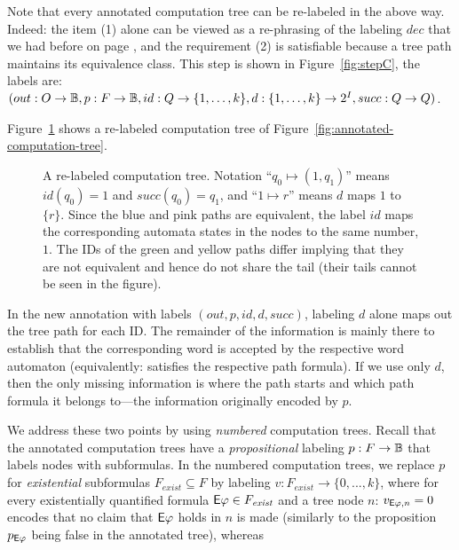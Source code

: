 Note that every annotated computation tree can be re-labeled in the above way.
Indeed:
the item (1) alone can be viewed as a re-phrasing of the labeling $dec$ that we had before on page \pageref{page:decision-mapping},
and the requirement (2) is satisfiable because a tree path maintains its equivalence class.
This step is shown in Figure~\ref{fig:stepC}, the labels are:
$(out:O\to\mathbb{B},
p:F\to\mathbb{B},
id: Q \to \{1,\ldots,k\},
d: \{1,\ldots,k\}\to {2^I},
succ: Q \to Q)$.

Figure~\ref{fig:relabeled-tree} shows a re-labeled computation tree of Figure~\ref{fig:annotated-computation-tree}.
\begin{figure}[tb]
\center

\caption{%
  A re-labeled computation tree.
  Notation ``$q_0 \mapsto (1,q_1)$'' means
  $id(q_0) = 1$ and $succ(q_0) = q_1$, and ``$1 \mapsto r$'' means $d$ maps $1$ to $\{r\}$.
  Since the blue and pink paths are equivalent,
  the label $id$ maps the corresponding automata states in the nodes
  to the same number, $1$.
  The IDs of the green and yellow paths differ implying that they are not equivalent and hence do not share the tail (their tails cannot be seen in the figure).
}
\label{fig:relabeled-tree}
\end{figure}

In the new annotation with labels $(out, p, id, d, succ)$,
labeling $d$ alone maps out the tree path for each ID.
The remainder of the information is mainly there to establish that the corresponding word
is accepted by the respective word automaton (equivalently: satisfies the respective path formula).
If we use only $d$, then the only missing information is where the path starts and which path formula it belongs to---the information originally encoded by $p$.


We address these two points by using \emph{numbered} computation trees.
Recall that the annotated computation trees have a \emph{propositional} labeling
$p: F \to \mathbb{B}$ that labels nodes with subformulas.
In the numbered computation trees,
we replace $p$ for \emph{existential} subformulas $F_\textit{exist} \subseteq F$
by labeling ${v: F_\textit{exist} \to \{0,...,k\}}$,
where for every existentially quantified formula ${\operatorname{\mathsf{E}}}\varphi \in F_\textit{exist}$ and a tree node $n$:
\li
\- $v_{{\operatorname{\mathsf{E}}}\varphi,n}=0$ encodes that no claim that ${\operatorname{\mathsf{E}}}\varphi$ holds in $n$ is made
   (similarly to the proposition $p_{{\operatorname{\mathsf{E}}}\varphi}$ being false in the annotated tree), whereas

